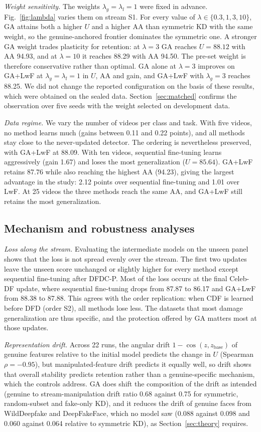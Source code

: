 \documentclass{ieeeaccess}
\begin{document}
\textit{Weight sensitivity.}\label{sec:lambda} The weights $\lambda_g=\lambda_l=1$ were fixed in advance. Fig.~\ref{fig:lambda} varies them on stream S1. For every value of $\lambda\in\{0.3,1,3,10\}$, GA attains both a higher $U$ and a higher AA than symmetric KD with the same weight, so the genuine-anchored frontier dominates the symmetric one. A stronger GA weight trades plasticity for retention: at $\lambda=3$ GA reaches $U=88.12$ with AA 94.93, and at $\lambda=10$ it reaches 88.29 with AA 94.50. The pre-set weight is therefore conservative rather than optimal. GA alone at $\lambda=3$ improves on GA+LwF at $\lambda_g=\lambda_l=1$ in $U$, AA and gain, and GA+LwF with $\lambda_g=3$ reaches 88.25. We did not change the reported configuration on the basis of these results, which were obtained on the sealed data. Section~\ref{sec:matched} confirms the observation over five seeds with the weight selected on development data.

\textit{Data regime.} We vary the number of videos per class and task. With five videos, no method learns much (gains between 0.11 and 0.22 points), and all methods stay close to the never-updated detector. The ordering is nevertheless preserved, with GA+LwF at 88.09. With ten videos, sequential fine-tuning learns aggressively (gain 1.67) and loses the most generalization ($U=85.64$). GA+LwF retains 87.76 while also reaching the highest AA (94.23), giving the largest advantage in the study: 2.12 points over sequential fine-tuning and 1.01 over LwF. At 25 videos the three methods reach the same AA, and GA+LwF still retains the most generalization.

\subsection{Mechanism and robustness analyses}
\textit{Loss along the stream.} Evaluating the intermediate models on the unseen panel shows that the loss is not spread evenly over the stream. The first two updates leave the unseen score unchanged or slightly higher for every method except sequential fine-tuning after DFDC-P. Most of the loss occurs at the final Celeb-DF update, where sequential fine-tuning drops from 87.87 to 86.17 and GA+LwF from 88.38 to 87.88. This agrees with the order replication: when CDF is learned before DFD (order S2), all methods lose less. The datasets that most damage generalization are thus specific, and the protection offered by GA matters most at those updates.

\textit{Representation drift.}\label{sec:drift} Across 22 runs, the angular drift $1-\cos(z,z_{\mathrm{base}})$ of genuine features relative to the initial model predicts the change in $U$ (Spearman $\rho=-0.95$), but manipulated-feature drift predicts it equally well, so drift shows that overall stability predicts retention rather than a genuine-specific mechanism, which the controls address. GA does shift the composition of the drift as intended (genuine to stream-manipulation drift ratio 0.68 against 0.75 for symmetric, random-subset and fake-only KD), and it reduces the drift of genuine faces from WildDeepfake and DeepFakeFace, which no model saw (0.088 against 0.098 and 0.060 against 0.064 relative to symmetric KD), as Section~\ref{sec:theory} requires.
\end{document}

